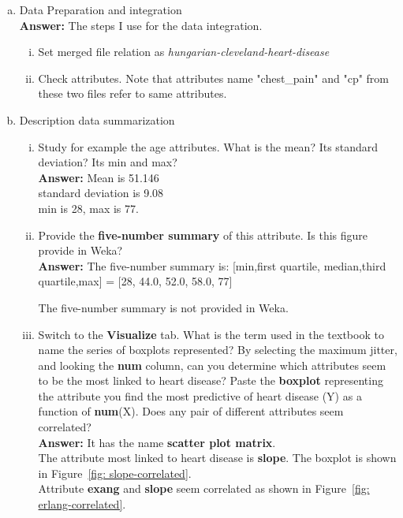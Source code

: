 \documentclass[11pt, final]{article}
\begin{document}
\begin{enumerate}[(a)]
\item Data Preparation and integration \\

\textbf{Answer:} The steps I use for the data integration.
\begin{enumerate}[(i)]
\item Set merged file relation as \emph{hungarian-cleveland-heart-disease}
\item Check attributes. Note that attributes name "chest\_pain" and "cp" from these two files refer to same attributes. 
\end{enumerate}

\item Description data summarization
\begin{enumerate}[(i)]
\item Study for example the age attributes. What is the mean? Its standard deviation? Its min and max? \\

\textbf{Answer:} Mean is 51.146 \\
 standard deviation is 9.08 \\
  min is 28, max is 77.
\item Provide the \textbf{five-number summary} of this attribute. Is this figure provide in Weka? \\

\textbf{Answer: } The five-number summary is: 
[min,first quartile, median,third quartile,max] =  [28, 44.0, 52.0, 58.0, 77]

The five-number summary is not provided in Weka.
\item Switch to the \textbf{Visualize} tab. What is the term used in the textbook to name the series of boxplots represented? By selecting the maximum jitter, and looking the \textbf{num} column, can you determine which attributes seem to be the most linked to heart disease? Paste the \textbf{boxplot} representing the attribute you find the most predictive of heart disease (Y) as a function of \textbf{num}(X). Does any pair of different attributes seem correlated? \\

\textbf{Answer:}
It has the name \textbf{scatter plot matrix}. \\
The attribute most linked to heart disease is \textbf{slope}. The boxplot is shown in Figure~\ref{fig: slope-correlated}. \\
Attribute \textbf{exang} and \textbf{slope} seem correlated as shown in Figure~\ref{fig: erlang-correlated}.



\end{enumerate}
\end{enumerate}
\end{document}
